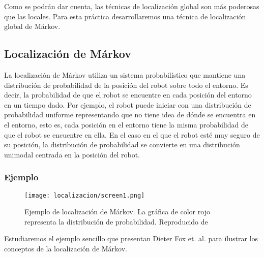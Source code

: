 Como se podrán dar cuenta, las técnicas de localización global son más poderosas que las locales. Para esta práctica desarrollaremos una técnica de localización global de Márkov.

\subsection{Localización de Márkov}

La localización de Márkov utiliza un sistema probabilístico que mantiene una distribución de probabilidad de la posición del robot sobre todo el entorno. Es decir, la probabilidad de que el robot se encuentre en cada posición del entorno en un tiempo dado. Por ejemplo, el robot puede iniciar con una distribución de probabilidad uniforme representando que no tiene idea de dónde se encuentra en el entorno, esto es, cada posición en el entorno tiene la misma probabilidad de que el robot se encuentre en ella. En el caso en el que el robot esté muy seguro de su posición, la distribución de probabilidad se convierte en una distribución unimodal centrada en la posición del robot.

\subsubsection{Ejemplo}

\begin{figure}
  \centering
  \texttt{[image: localizacion/screen1.png]}
  \caption{Ejemplo de localización de Márkov. La gráfica de color rojo representa la distribución de probabilidad. Reproducido de \parencite{Dieter1999}}
  \label{fig:screen1}
\end{figure}


Estudiaremos el ejemplo sencillo que presentan Dieter Fox et. al. para ilustrar los conceptos de la localización de Márkov.


